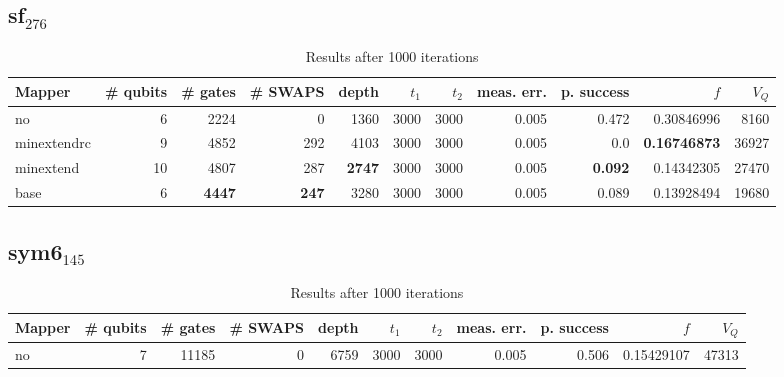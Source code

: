 \documentclass[11pt]{article}
\begin{document}
\subsection{sf\(_{\text{276}}\)}
\label{sec:orgf8a4465}
\begin{table}[H]
\caption{\label{tab:org4076cbb}
Results after 1000 iterations}
\centering
\small
\begin{tabular}{lrrrrrrrrrr}
\hline
Mapper & \# qubits & \# gates & \# SWAPS & depth & \(t_1\) & \(t_2\) & meas. err. & p. success & \(f\) & \(V_Q\)\\
\hline
no & 6 & 2224 & 0 & 1360 & 3000 & 3000 & 0.005 & 0.472 & 0.30846996 & 8160\\
\hline
minextendrc & 9 & 4852 & 292 & 4103 & 3000 & 3000 & 0.005 & 0.0 & \textbf{0.16746873} & 36927\\
minextend & 10 & 4807 & 287 & \textbf{2747} & 3000 & 3000 & 0.005 & \textbf{0.092} & 0.14342305 & 27470\\
base & 6 & \textbf{4447} & \textbf{247} & 3280 & 3000 & 3000 & 0.005 & 0.089 & 0.13928494 & 19680\\
\hline
\end{tabular}
\end{table}
\subsection{sym6\(_{\text{145}}\)}
\label{sec:org5e16ccf}
\begin{table}[H]
\caption{\label{tab:orgce73fc3}
Results after 1000 iterations}
\centering
\small
\begin{tabular}{lrrrrrrrrrr}
\hline
Mapper & \# qubits & \# gates & \# SWAPS & depth & \(t_1\) & \(t_2\) & meas. err. & p. success & \(f\) & \(V_Q\)\\
\hline
no & 7 & 11185 & 0 & 6759 & 3000 & 3000 & 0.005 & 0.506 & 0.15429107 & 47313\\
\hline
\end{tabular}
\end{table}
\end{document}
